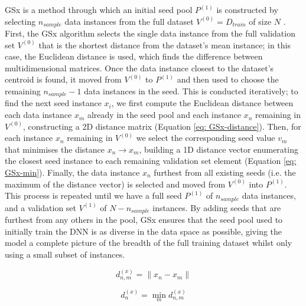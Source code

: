 \documentclass[a4paper, 11pt]{report}
\begin{document}
    GSx \citep{wu-2019} is a method through which an initial seed pool $P^{(1)}$ is constructed by selecting $n_{sample}$ data instances from the full dataset $V^{(0)} = D_{train}$ of size $N$ \citep{wu-2019}. First, the GSx algorithm selects the single data instance from the full validation set $V^{(0)}$ that is the shortest distance from the dataset's mean instance; in this case, the Euclidean distance is used, which finds the difference between multidimensional matrices. Once the data instance closest to the dataset's centroid is found, it moved from $V^{(0)}$ to $P^{(1)}$ and then used to choose the remaining $n_{sample} - 1$ data instances in the seed. This is conducted iteratively; to find the next seed instance $x_i$, we first compute the Euclidean distance between each data instance $x_m$ already in the seed pool and each instance $x_n$ remaining in $V^{(0)}$, constructing a 2D distance matrix (Equation \ref{eq: GSx-distance}). Then, for each instance $x_n$ remaining in $V^{(0)}$ we select the corresponding seed value $v_m$ that minimises the distance $x_n \to x_m$, building a 1D distance vector enumerating the closest seed instance to each remaining validation set element (Equation \ref{eq: GSx-min}). Finally, the data instance $x_n$ furthest from all existing seeds (i.e. the maximum of the distance vector) is selected and moved from $V^{(0)}$ into $P^{(1)}$. This process is repeated until we have a full seed $P^{(1)}$ of $n_{sample}$ data instances, and a validation set $V^{(1)}$ of $N - n_{sample}$ instances. By adding seeds that are furthest from any others in the pool, GSx ensures that the seed pool used to initially train the DNN is as diverse in the data space as possible, giving the model a complete picture of the breadth of the full training dataset whilst only using a small subset of instances.


    \begin{equation}
        \label{eq: GSx-distance}
        d^{(x)}_{n, m} = \lVert x_n - x_m \lVert
    \end{equation}
  
    \begin{equation}
        \label{eq: GSx-min}
        d^{(x)}_n = \min_m d^{(x)}_{n, m}
    \end{equation}
\end{document}
